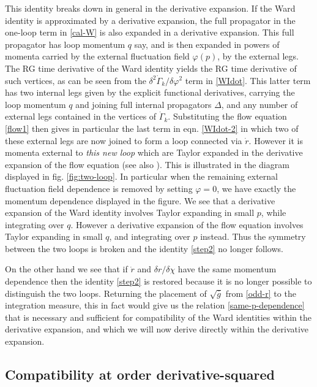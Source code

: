 \documentclass[11pt]{book} %
\begin{document}
This identity breaks down in general in the derivative expansion. If the Ward identity  is approximated by a derivative expansion, the full propagator in the one-loop term in \eqref{cal-W} is also expanded in a derivative expansion. This full propagator
 has loop momentum $q$ say, and is then expanded in powers of momenta carried by the external fluctuation field $\varphi(p)$, \ie by the external legs.
 The RG time derivative of the Ward identity yields the RG time derivative of such vertices, as can be seen from the $\delta^2\dot{\Gamma}_k/\delta\varphi^2$ term  in \eqref{WIdot}. This latter term has two internal legs given by the explicit functional derivatives, carrying the loop momentum $q$ and joining full internal propagators $\Delta$, and any number of external legs contained in the vertices of $\dot{\Gamma}_k$. Substituting the flow equation \eqref{flow1} then gives in particular the last term in eqn. \eqref{WIdot-2} in which two of these external legs are now joined to form a loop connected via $\dot{r}$. However it is momenta external to \emph{this new loop} which are Taylor expanded in the derivative expansion of the flow equation (see also \cite{Morris1999,Morris2001}). This is illustrated in the diagram displayed in fig. \ref{fig:two-loop}. In particular when the remaining external fluctuation field dependence is removed by setting $\varphi=0$, we have exactly the momentum dependence displayed in the figure. We see that a derivative expansion of the Ward identity involves Taylor expanding %
 in small $p$, while integrating over $q$. However a derivative expansion of the flow equation involves Taylor expanding %
 in small $q$, and integrating over $p$ instead. Thus the symmetry between the two loops is broken and the identity \eqref{step2} no longer follows.
 
 On the other hand we see that if $\dot{r}$ and $\delta r/\delta\chi$ have the same momentum dependence then the identity \eqref{step2} is restored because it is no longer possible to distinguish the two loops. Returning the placement of $\sqrt{\bar{g}}$ from \eqref{odd-r} to the integration measure, this in fact would give us the relation \eqref{same-p-dependence} that is necessary and sufficient for compatibility of the Ward identities within the derivative expansion, and which we will now derive directly within the derivative expansion.
 

\subsection{Compatibility at order derivative-squared}\label{sec:compatibility-at-d2}
\end{document}

